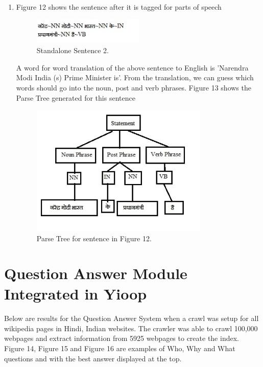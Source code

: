 \begin{enumerate}
\break
\item  Figure 12 shows the sentence after it is tagged for parts of speech

\begin{figure}[htb]
\centering
\includegraphics[width=0.5\textwidth]{images/sentence_testcase2.jpg}
\caption{Standalone Sentence 2.} 
\label{fig:sentence_testcase2}
\end{figure}

A word for word translation of the above sentence to English is 'Narendra Modi India (s) Prime Minister is'. From the translation, we can guess which words should go into the noun, post and verb phrases. Figure 13 shows the Parse Tree generated for this sentence 

\begin{figure}[htb]
\centering
\includegraphics[width=0.8\textwidth]{images/standalone_testcase2.jpg}
\caption{Parse Tree for sentence in Figure 12.} 
\label{fig:standalone_testcase2}
\end{figure}

\end{enumerate}

\break
\section{Question Answer Module Integrated in Yioop}
\paragraph{}
Below are results for the Question Answer System when a crawl was setup for all wikipedia pages in Hindi, Indian websites. The crawler was able to crawl 100,000 webpages and extract information from 5925 webpages to create the index. Figure 14, Figure 15 and Figure 16 are examples of Who, Why and What questions and with the best answer displayed at the top.

